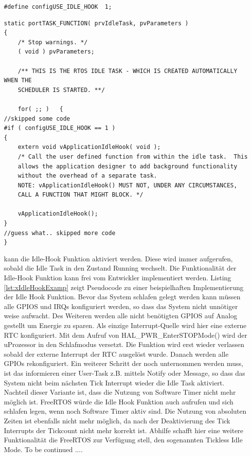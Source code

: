 \begin{lstlisting}[label=lst:defineIdleHook, numbers = none]
#define configUSE_IDLE_HOOK  1; 
\end{lstlisting}
\begin{lstlisting}[caption={Aufruf der IdleTask Hook Funktion. Aus Task.c},captionpos=b, label=lst:xIdleTaskHook, float=htb!]
static portTASK_FUNCTION( prvIdleTask, pvParameters )
{
	/* Stop warnings. */
	( void ) pvParameters;

	/** THIS IS THE RTOS IDLE TASK - WHICH IS CREATED AUTOMATICALLY WHEN THE
	SCHEDULER IS STARTED. **/

	for( ;; )	{
//skipped some code
#if ( configUSE_IDLE_HOOK == 1 )
{
	extern void vApplicationIdleHook( void );
	/* Call the user defined function from within the idle task.  This
	allows the application designer to add background functionality
	without the overhead of a separate task.
	NOTE: vApplicationIdleHook() MUST NOT, UNDER ANY CIRCUMSTANCES,
	CALL A FUNCTION THAT MIGHT BLOCK. */
	
	vApplicationIdleHook();
}
//guess what.. skipped more code
}     
\end{lstlisting}
kann die Idle-Hook Funktion aktiviert werden. Diese wird immer aufgerufen, sobald die Idle Task in den Zustand Running wechselt. Die Funktionalität der Idle-Hook Funktion kann frei vom Entwickler implementiert werden. Listing \ref{lst:xIdleHookExamp} zeigt Pseudocode zu einer beispielhaften Implementierung der Idle Hook Funktion. Bevor das System schlafen gelegt werden kann müssen alle GPIOS und IRQs konfiguriert werden, so dass das System nicht unnötiger weise aufwacht. Des Weiteren werden alle nicht benötigten GPIOS auf Analog gestellt um Energie zu sparen. Als einzige Interrupt-Quelle wird hier eine externe RTC konfiguriert. Mit dem Aufruf von HAL\_PWR\_EnterSTOPMode() wird der uProzessor in den Schlafmodus versetzt. Die Funktion wird erst wieder verlassen sobald der externe Interrupt der RTC ausgelöst wurde. Danach werden alle GPIOs rekonfiguriert. Ein weiterer Schritt der noch unternommen werden muss, ist das informieren einer User-Task z.B. mittels Notify oder Message, so dass das System nicht beim nächsten Tick Interrupt wieder die Idle Task aktiviert. Nachteil dieser Variante ist, dass die Nutzung von Software Timer nicht mehr möglich ist. FreeRTOS würde die Idle Hook Funktion auch aufrufen und sich schlafen legen, wenn noch Software Timer aktiv sind. Die Nutzung von absoluten Zeiten ist ebenfalls nicht mehr möglich, da nach der Deaktivierung des Tick Interrupts der Tickcount nicht mehr korrekt ist. Abhilfe schafft hier eine weitere Funktionalität die FreeRTOS zur Verfügung stell, den sogenannten Tickless Idle Mode. To be continued ....
